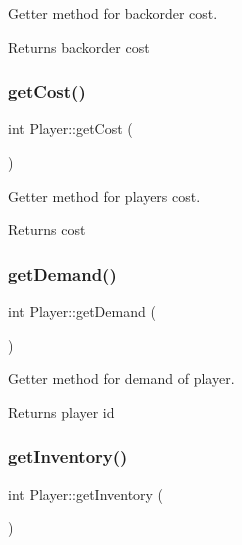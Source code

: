 Getter method for backorder cost. 

\begin{DoxyReturn}{Returns}
backorder cost 
\end{DoxyReturn}
\mbox{\label{class_player_a3a1e9666f1da8750452296310ed95e1f}} 
\subsubsection{\texorpdfstring{get\+Cost()}{getCost()}}
{\footnotesize\ttfamily int Player\+::get\+Cost (\begin{DoxyParamCaption}{ }\end{DoxyParamCaption})}



Getter method for player\textquotesingle{}s cost. 

\begin{DoxyReturn}{Returns}
cost 
\end{DoxyReturn}
\mbox{\label{class_player_a8bfca991628b682ff9cae6d05ee9131c}} 
\subsubsection{\texorpdfstring{get\+Demand()}{getDemand()}}
{\footnotesize\ttfamily int Player\+::get\+Demand (\begin{DoxyParamCaption}{ }\end{DoxyParamCaption})}



Getter method for demand of player. 

\begin{DoxyReturn}{Returns}
player id 
\end{DoxyReturn}
\mbox{\label{class_player_ae21d65a545c20c70ac7a53389b223ce6}} 
\subsubsection{\texorpdfstring{get\+Inventory()}{getInventory()}}
{\footnotesize\ttfamily int Player\+::get\+Inventory (\begin{DoxyParamCaption}{ }\end{DoxyParamCaption})}



